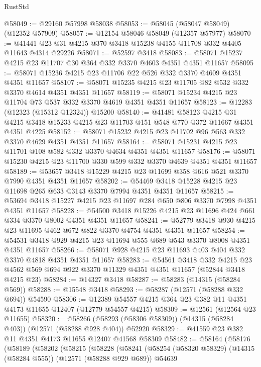 \begin{lexlean}{RustStd}
\begin{coremodule}
@58049 := @29160 @57998 @58038
@58053 := @58045 (@58047 @58049) (@12352 @57909)
@58057 := @12154 @58046 @58049 (@12357 @57977)
@58070 := @41441 @23 @31 @4215 @370 @3418 @15238 @4155 @11708 @332 @4405 @11643 @4314 @29226
@58071 := @52597 @3418
@58083 := @58071 @15237 @4215 @23 @11707 @30 @364 @332 @3370 @4603 @4351 @4351 @11657
@58095 := @58071 @15236 @4215 @23 @11706 @22 @526 @332 @3370 @4609 @4351 @4351 @11657
@58107 := @58071 @15235 @4215 @23 @11705 @82 @532 @332 @3370 @4614 @4351 @4351 @11657
@58119 := @58071 @15234 @4215 @23 @11704 @73 @537 @332 @3370 @4619 @4351 @4351 @11657
@58123 := @12283 (@12323 (@15312 @12324)) @15200
@58140 := @41481
    @58123
    @4215
    @31
    @4215
    @3418
    @15233
    @4215
    @23
    @11703
    @151
    @548
    @770
    @372
    @11667
    @4351
    @4351
    @4225
@58152 := @58071 @15232 @4215 @23 @11702 @96 @563 @332 @3370 @4629 @4351 @4351 @11657
@58164 := @58071 @15231 @4215 @23 @11701 @108 @582 @332 @3370 @4634 @4351 @4351 @11657
@58176 := @58071 @15230 @4215 @23 @11700 @330 @599 @332 @3370 @4639 @4351 @4351 @11657
@58189 := @53657 @3418 @15229 @4215 @23 @11699 @358 @616 @521 @3370 @7990 @4351 @4351 @11657
@58202 := @54469 @3418 @15228 @4215 @23 @11698 @265 @633 @3143 @3370 @7994 @4351 @4351 @11657
@58215 := @53694 @3418 @15227 @4215 @23 @11697 @284 @650 @806 @3370 @7998 @4351 @4351 @11657
@58228 := @54500 @3418 @15226 @4215 @23 @11696 @424 @661 @334 @3370 @8002 @4351 @4351 @11657
@58241 := @52779 @3418 @930 @4215 @23 @11695 @462 @672 @822 @3370 @4754 @4351 @4351 @11657
@58254 := @54531 @3418 @929 @4215 @23 @11694 @555 @689 @543 @3370 @8008 @4351 @4351 @11657
@58266 := @58071 @928 @4215 @23 @11693 @403 @404 @332 @3370 @4818 @4351 @4351 @11657
@58283 := @54561
    @3418
    @332
    @4215
    @23
    @4562
    @569
    @694
    @922
    @3370
    @11329
    @4351
    @4351
    @11657
    (@52844 @3418 @4215 @23)
@58284 := @14327 @3418
@58287 := @58283 (@14315 (@58284 @569))
@58288 := @15548 @3418
@58293 := @58287 (@12571 (@58288 @332 @694)) @54590
@58306 := @12389 @54557 @4215 @364 @23 @382 @11 @4351 @4173 @11655 @12407 (@12779 @54557 @4215)
@58309 := @12561 (@12564 @23 @11655)
@58320 := @58266 (@58293 (@58306 @58309)) (@14315 (@58284 @403)) (@12571 (@58288 @928 @404)) @52920
@58329 := @41559 @23 @382 @11 @4351 @4173 @11655 @12407 @41568 @58309
@58482 := @58164
    (@58176
      (@58189
        (@58202
          (@58215
            (@58228
              (@58241
                (@58254
                  (@58320 @58329)
                  (@14315 (@58284 @555))
                  (@12571 (@58288 @929 @689))
                  @54639

\end{coremodule}
\end{lexlean}
